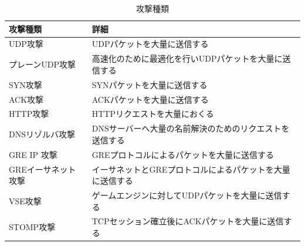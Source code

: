 \begin{table}[h]
   \caption{攻撃種類}
   \centering
   \label{tab:attack}
   \begin{tabular}{|l|l|}
   \hline
   攻撃種類                            & 詳細 \\ \hline \hline
   UDP攻撃                           &   UDPパケットを大量に送信する \\ \hline
   プレーンUDP攻撃                    & 高速化のために最適化を行いUDPパケットを大量に送信する   \\ \hline
   SYN攻撃                           &  SYNパケットを大量に送信する  \\ \hline
   ACK攻撃                           &  ACKパケットを大量に送信する  \\ \hline
   HTTP攻撃                          &  HTTPリクエストを大量におくる  \\ \hline
   DNSリゾルバ攻撃                       &  DNSサーバーへ大量の名前解決のためのリクエストを送信する  \\ \hline
   GRE IP 攻撃                       &  GREプロトコルによるパケットを大量に送信する  \\ \hline
   GREイーサネット攻撃                     &  イーサネットとGREプロトコルによるパケットを大量に送信する  \\ \hline
   VSE攻撃                           &  ゲームエンジンに対してUDPパケットを大量に送信する  \\ \hline
   STOMP攻撃                         &  TCPセッション確立後にACKパケットを大量に送信する  \\ \hline
   \end{tabular}
\end{table}


